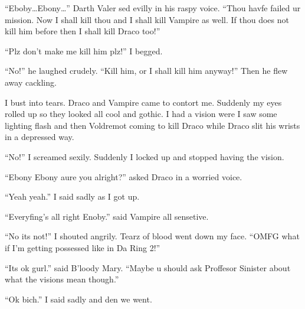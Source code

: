 \enquote{Eboby\ldots Ebony\ldots} Darth Valer sed evilly in his raspy voice. \enquote{Thou havfe failed ur mission. Now I shall kill thou and I shall kill Vampire as well. If thou does not kill him before then I shall kill Draco too!}

\enquote{Plz don't make me kill him plz!} I begged.

\enquote{No!} he laughed crudely. \enquote{Kill him, or I shall kill him anyway!} Then he flew away cackling.

I bust into tears. Draco and Vampire came to contort me. Suddenly my eyes rolled up so they looked all cool and gothic. I had a vision were I saw some lighting flash and then Voldremot coming to kill Draco while Draco slit his wrists in a depressed way.

\enquote{No!} I screamed sexily. Suddenly I locked up and stopped having the vision.

\enquote{Ebony Ebony aure you alright?} asked Draco in a worried voice.

\enquote{Yeah yeah.} I said sadly as I got up.

\enquote{Everyfing's all right Enoby.} said Vampire all sensetive.

\enquote{No its not!} I shouted angrily. Tearz of blood went down my face. \enquote{OMFG what if I'm getting possessed like in Da Ring 2!}

\enquote{Its ok gurl.} said B'loody Mary. \enquote{Maybe u should ask Proffesor Sinister about what the visions mean though.}

\enquote{Ok bich.} I said sadly and den we went.

